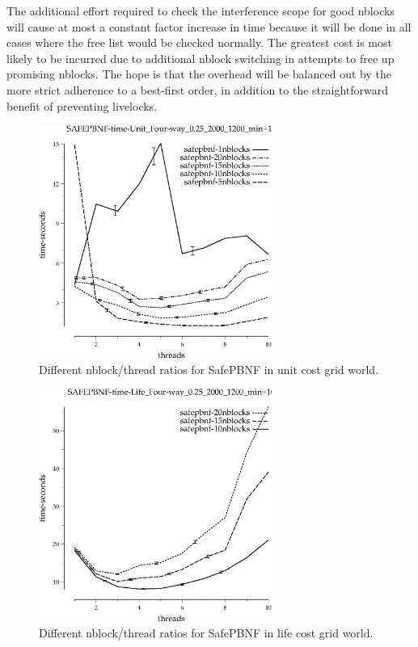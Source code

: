 \documentclass{article}
\begin{document}
The additional effort required to check the interference scope for good nblocks will cause at most a constant factor increase in time because it will be done in all cases where the free list would be checked normally. The greatest cost is most likely to be incurred due to additional nblock switching in attempts to free up promising nblocks. The hope is that the overhead will be balanced out by the more strict adherence to a best-first order, in addition to the straightforward benefit of preventing livelocks.

\begin{figure}[h!]
\includegraphics[width=3in]{../graphs/grid_unit_four-way_0.25_2000_1200/SAFEPBNF-time-Unit_Four-way_0.25_2000_1200_min=10.eps}
\caption{Different nblock/thread ratios for SafePBNF in unit cost grid world.}
\label{fig:SafePBNF-nblock-grid}
\end{figure}

\begin{figure}[h!]
\includegraphics[width=3in]{../graphs/grid_life_four-way_0.25_2000_1200/SAFEPBNF-time-Life_Four-way_0.25_2000_1200_min=10.eps}
\caption{Different nblock/thread ratios for SafePBNF in life cost grid world.}
\label{fig:SafePBNF-nblock-life}
\end{figure}
\end{document}
